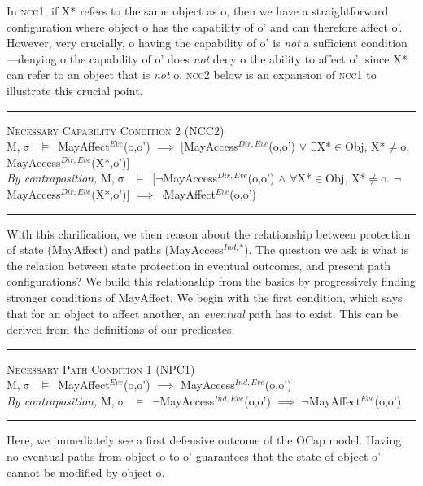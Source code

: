 \documentclass[a4paper,11pt, twoside,twocolumn]{article}
\newenvironment{logic}[1][]
{\begin{flushleft} \small }
{\end{flushleft}}
\newcommand{\loin}{$\in$}
\newcommand{\loforall}{$\forall$}
\newcommand{\loexists}{$\exists$}
\newcommand{\loand}{$\land$}
\newcommand{\loor} {$\lor$}
\newcommand{\loneq} {$\neq$}
\newcommand{\loimplies}{$\implies$}
\newcommand{\losigma}{$\upsigma$}
\newcommand{\loturns} {$\vDash$}
\newcommand{\loneg}{$\boldsymbol \neg$}
\newcommand{\ablock} {\null\qquad}
\begin{document}
In \textsc{ncc1}, if X* refers to the same object as o, then we have a straightforward configuration where object o has the capability of o' and can therefore affect o'. However, very crucially, o having the capability of o' is \textit{not} a sufficient condition---denying o the capability of o' does \textit{not} deny o the ability to affect o', since X* can refer to an object that is \textit{not} o. \textsc{ncc2} below is an expansion of \textsc{ncc1} to illustrate this crucial point.
\begin{logic}
\hrule\null
\textsc{\normalsize *Necessary Capability Condition 2 (NCC2)}\\
M,\losigma\ \loturns\ MayAffect$^{Eve}$(o,o') \loimplies\linebreak
	\ablock $[$MayAccess$^{Dir,Eve}$(o,o') \loor\linebreak
	\ablock \loexists X*\loin{Obj}, X*\loneq o. MayAccess$^{Dir,Eve}$(X*,o')$]$
\linebreak\\
\textit{By contraposition,}\linebreak
M,\losigma\ \loturns\ $[$\loneg MayAccess$^{Dir,Eve}$(o,o') \loand\linebreak
	\ablock \loforall X*\loin{Obj}, X*\loneq o. \loneg MayAccess$^{Dir,Eve}$(X*,o')$]$ \linebreak
	\ablock \loimplies\loneg MayAffect$^{Eve}$(o,o')\linebreak
\hrule
\end{logic}
With this clarification, we then reason about the relationship between protection of state (MayAffect) and paths (MayAccess$^{Ind,*}$). The question we ask is what is the relation between state protection in eventual outcomes, and present path configurations? We build this relationship from the basics by progressively finding stronger conditions of MayAffect. We begin with the first condition, which says that for an object to affect another, an \textit{eventual} path has to exist. This can be derived from the definitions of our predicates.
\begin{logic}
\hrule\null
\textsc{\normalsize *Necessary Path Condition 1 (NPC1)}\\
M,\losigma\ \loturns\ MayAffect$^{Eve}$(o,o') \loimplies\linebreak
	\ablock MayAccess$^{Ind,Eve}$(o,o')
\linebreak \\
\textit{By contraposition,}\linebreak
M,\losigma\ \loturns\ \loneg MayAccess$^{Ind,Eve}$(o,o') \loimplies\linebreak
	\ablock \loneg MayAffect$^{Eve}$(o,o')
\linebreak
\hrule
\end{logic}
Here, we immediately see a first defensive outcome of the OCap model. Having no eventual paths from object o to o' guarantees that the state of object o' cannot be modified by object o.\\
\end{document}
